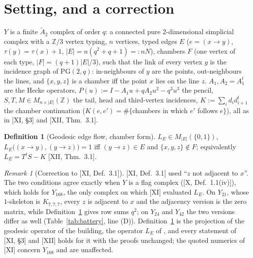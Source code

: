 \documentclass[11pt]{amsart}
\numberwithin{equation}{section}
\theoremstyle{definition}
\newtheorem{definition}[theorem]{Definition}
\theoremstyle{remark}
\newtheorem{remark}[theorem]{Remark}
\newcommand{\Z}{\mathbb{Z}}
\newcommand{\LE}{L_E}
\newcommand{\PG}{\mathrm{PG}}
\newcommand{\Atwo}{\widetilde A_2}
\begin{document}
\section{Setting, and a correction}\label{sec:setting}

$Y$ is a finite $\Atwo$ complex of order $q$: a connected pure $2$-dimensional simplicial
complex with a $\Z/3$ vertex typing, $n$ vertices, typed edges $E$ ($e=(x\to y)$,
$\tau(y)=\tau(x)+1$, $|E|=n(q^{2}+q+1)=:nN$), chambers $F$ (one vertex of each type,
$|F|=(q{+}1)|E|/3$), such that the link of every vertex $y$ is the incidence graph of
$\PG(2,q)$: in-neighbours of $y$ are the points, out-neighbours the lines, and $\{x,y,z\}$ is a
chamber iff the point $x$ lies on the line $z$. $A_1,A_2=A_1^{t}$ are the Hecke operators,
$P(u):=I-A_1u+qA_2u^{2}-q^{3}u^{3}$ the pencil, $S,T,M\in M_{n\times|E|}(\Z)$ the tail, head and
third-vertex incidences, $K:=\sum_id_id_{i+1}^{t}$ the chamber continuation
($K(e,e')=\#\{$chambers in which $e'$ follows $e\}$), all as in [XI, \S3] and [XII, Thm.~3.1].

\begin{definition}[Geodesic edge flow, chamber form]\label{def:LE}
$\LE\in M_{|E|}(\{0,1\})$, $\LE\bigl((x\to y),(y\to z)\bigr)=1$ iff $(y\to z)\in E$ and
$\{x,y,z\}\notin F$; equivalently $\LE=T^{t}S-K$ [XII, Thm.~3.1].
\end{definition}

\begin{remark}[Correction to {\rm[XI, Def.~3.1]}]\label{rem:corrXI}
[XI, Def.~3.1] used ``$z$ not adjacent to $x$''. The two conditions agree exactly when $Y$ is
a flag complex ([X, Def.~1.1(iv)]), which holds for $Y_{168}$, the only complex on which [XI]
evaluated $\LE$. On $Y_{21}$, whose $1$-skeleton is $K_{7,7,7}$, every $z$ is adjacent to $x$
and the adjacency version is the zero matrix, while Definition~\ref{def:LE} gives row sums
$q^{2}$; on $Y_{24}$ and $Y_{42}$ the two versions differ as well (Table~\ref{tab:battery},
line (D)). Definition~\ref{def:LE} is the projection of the geodesic operator of the
building, the operator $L_E$ of \cite{KL}, and every statement of [XI, \S3] and [XII] holds
for it with the proofs unchanged; the quoted numerics of [XI] concern $Y_{168}$ and are
unaffected.
\end{remark}
\end{document}
